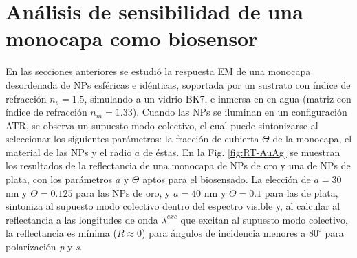 \section{Análisis de sensibilidad  de una monocapa como biosensor}
\label{section:sensLambda}

En las secciones anteriores se estudió la respuesta EM de una monocapa desordenada de NPs esféricas e idénticas, soportada por un sustrato con índice de refracción $n_s=1.5$, simulando a un vidrio BK7, e inmersa en en agua (matriz con índice de refracción $n_m=1.33$). Cuando las NPs se iluminan en un configuración ATR, se observa un supuesto modo colectivo, el cual puede sintonizarse al seleccionar los siguientes parámetros: la fracción de cubierta $\Theta$ de la monocapa, el material de las NPs y el radio $a$ de éstas. En la Fig. \ref{fig:RT-AuAg} se muestran los resultados de la reflectancia de una monocapa de NPs de oro y una de NPs de plata, con los parámetros $a$ y $\Theta$ aptos para el biosensado. La elección de $a=30$ nm y $\Theta=0.125$ para las NPs de oro, y $a=40$ nm y $\Theta=0.1$ para las de plata, sintoniza al supuesto modo colectivo dentro del espectro visible y, al calcular al reflectancia a las longitudes de onda $\lambda^{exc}$ que excitan al supuesto modo colectivo, la reflectancia es mínima ($R\approx 0 $) para ángulos de incidencia menores a $80^\circ$ para polarización \emph{p} y \emph{s}.

